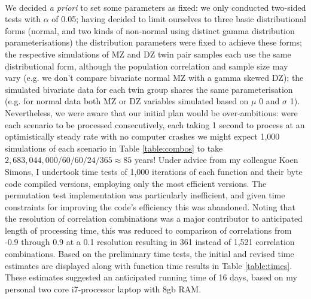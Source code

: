 \\
We decided \textit{a priori} to set some parameters as fixed: we only conducted two-sided tests with $\alpha$ of 0.05;  having decided to limit ourselves to three basic distributional forms (normal, and two kinds of non-normal using distinct gamma distribution parameterisations) the distribution parameters were fixed to achieve these forms; the respective simulations of MZ and DZ twin pair samples each use the same distributional form, although the population correlation and sample size may vary (e.g. we don't compare bivariate normal MZ with a gamma skewed DZ); the simulated bivariate data for each twin group shares the same parameterisation (e.g. for normal data both MZ or DZ variables simulated based on $\mu$ 0 and $\sigma$ 1).  Nevertheless, we were aware that our initial plan would be over-ambitious: were each scenario to be processed consecutively, each taking 1 second to process at an optimistically steady rate with no computer crashes we might expect 1,000 simulations of each scenario in Table \ref{table:combos} to take $2,683,044,000/60/60/24/365 \approx 85$ years!  Under advice from my colleague Koen Simons, I undertook time tests of 1,000 iterations of each function and their byte code compiled versions, employing only the most efficient versions.  The permutation test implementation was particularly inefficient, and given time constraints for improving the code's efficiency this was abandoned.  Noting that the resolution of correlation combinations was a major contributor to anticipated length of processing time, this was reduced to comparison of correlations from -0.9 through 0.9 at a 0.1 resolution resulting in 361 instead of 1,521 correlation combinations.  Based on the preliminary time tests, the initial and revised time estimates are displayed along with function time results in Table \ref{table:times}.  These estimates suggested an anticipated running time of 16 days, based on my personal two core i7-processor laptop with 8gb RAM.
\\

